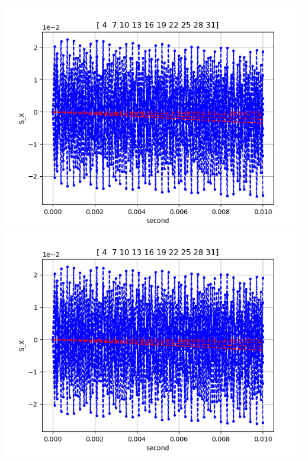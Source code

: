 \documentclass[pdf]{beamer}
\begin{document}
\begin{frame}
	\includegraphics[scale=.33]{decoh/Dbunch/Sx(unoptim)_for_D_bunch_decoh}
	\includegraphics[scale=.33]{decoh/Dbunch/Sx(optim)_for_D_bunch_decoh}
\end{frame}
\end{document}
